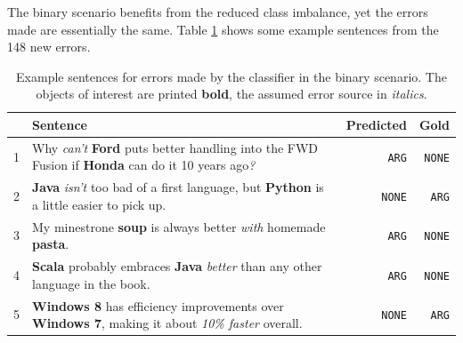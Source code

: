 %
%
%
%

The binary scenario benefits from the reduced class imbalance, yet the errors made are essentially the same. Table \ref{tbl:2_mistakes} shows some example sentences from the 148 new errors.

\begin{table}[h]
\caption{Example sentences for errors made by the classifier in the binary scenario. The objects of interest are printed \textbf{bold}, the assumed error source in \emph{italics}.}
\label{tbl:2_mistakes}
\begin{tabularx}{\linewidth}{lXrr}
\toprule
 & Sentence & Predicted & Gold \\ \midrule
1 & Why \emph{can't} \textbf{Ford} puts better handling into the FWD Fusion if \textbf{Honda} can do it 10 years ago\emph{?} & \texttt{ARG} & \texttt{NONE}\\
2 & \textbf{Java} \emph{isn't} too bad of a first language, but \textbf{Python} is a little easier to pick up. & \texttt{NONE} & \texttt{ARG} \\
3 & My minestrone \textbf{soup} is always better \emph{with} homemade \textbf{pasta}. & \texttt{ARG} & \texttt{NONE} \\
4 & \textbf{Scala} probably embraces \textbf{Java} \emph{better} than any other language in the book. & \texttt{ARG} & \texttt{NONE} \\
5 & \textbf{Windows 8} has efficiency improvements over \textbf{Windows 7}, making it about \emph{10\% faster} overall. & \texttt{NONE} & \texttt{ARG} \\
\bottomrule
\end{tabularx}

\end{table}

